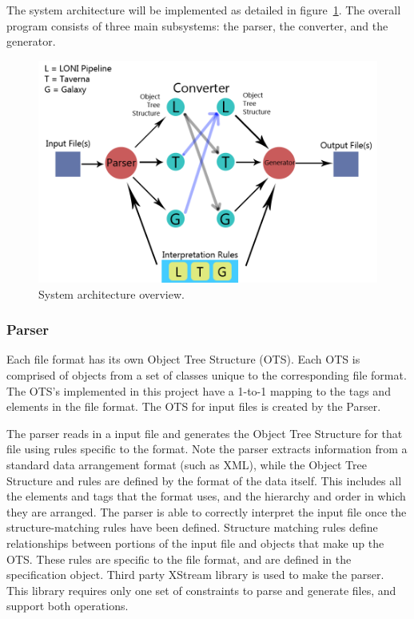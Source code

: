 \documentclass[12pt]{article}
\begin{document}
The system architecture will be implemented as detailed in figure~\ref{fig:architecture}. The overall program consists of three main subsystems: the parser, the converter, and the generator. 

\begin{figure}[htbp]
\centering
\includegraphics[width=\textwidth]{architecture.png}
\caption{System architecture overview.}
\label{fig:architecture}
\end{figure}

\subsubsection{Parser}
\label{ots}

Each file format has its own Object Tree Structure (OTS). Each OTS is comprised of objects from a set of classes unique to the corresponding file format. The OTS's implemented in this project have a 1-to-1 mapping to the tags and elements in the file format. The OTS for input files is created by the Parser.

The parser reads in a input file and generates the Object Tree Structure for that file using rules specific to the format. Note the parser extracts information from a standard data arrangement format (such as XML), while the Object Tree Structure and rules are defined by the format of the data itself. This includes all the elements and tags that the format uses, and the hierarchy and order in which they are arranged. The parser is able to correctly interpret the input file once the structure-matching rules have been defined. Structure matching rules define relationships between portions of the input file and objects that make up the OTS. These rules are specific to the file format, and are defined in the specification object. Third party XStream library is used to make the parser. This library requires only one set of constraints to parse and generate files, and support both operations.  
\end{document}
